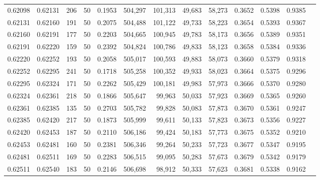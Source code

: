 \begin{tabular}{rrrrrrrrrrrrr}
0.62098 & 0.62131 &   206 &  50 &                                     0.1953 & 504,297 & 101,313 &  49,683 &  58,273 & 0.3652 & 0.5398 & 0.9385 \\
0.62131 & 0.62160 &   191 &  50 &                                     0.2075 & 504,488 & 101,122 &  49,733 &  58,223 & 0.3654 & 0.5393 & 0.9367 \\
0.62160 & 0.62191 &   177 &  50 &                                     0.2203 & 504,665 & 100,945 &  49,783 &  58,173 & 0.3656 & 0.5389 & 0.9351 \\
0.62191 & 0.62220 &   159 &  50 &                                     0.2392 & 504,824 & 100,786 &  49,833 &  58,123 & 0.3658 & 0.5384 & 0.9336 \\
0.62220 & 0.62252 &   193 &  50 &                                     0.2058 & 505,017 & 100,593 &  49,883 &  58,073 & 0.3660 & 0.5379 & 0.9318 \\
0.62252 & 0.62295 &   241 &  50 &                                     0.1718 & 505,258 & 100,352 &  49,933 &  58,023 & 0.3664 & 0.5375 & 0.9296 \\
0.62295 & 0.62324 &   171 &  50 &                                     0.2262 & 505,429 & 100,181 &  49,983 &  57,973 & 0.3666 & 0.5370 & 0.9280 \\
0.62324 & 0.62361 &   218 &  50 &                                     0.1866 & 505,647 &  99,963 &  50,033 &  57,923 & 0.3669 & 0.5365 & 0.9260 \\
0.62361 & 0.62385 &   135 &  50 &                                     0.2703 & 505,782 &  99,828 &  50,083 &  57,873 & 0.3670 & 0.5361 & 0.9247 \\
0.62385 & 0.62420 &   217 &  50 &                                     0.1873 & 505,999 &  99,611 &  50,133 &  57,823 & 0.3673 & 0.5356 & 0.9227 \\
0.62420 & 0.62453 &   187 &  50 &                                     0.2110 & 506,186 &  99,424 &  50,183 &  57,773 & 0.3675 & 0.5352 & 0.9210 \\
0.62453 & 0.62481 &   160 &  50 &                                     0.2381 & 506,346 &  99,264 &  50,233 &  57,723 & 0.3677 & 0.5347 & 0.9195 \\
0.62481 & 0.62511 &   169 &  50 &                                     0.2283 & 506,515 &  99,095 &  50,283 &  57,673 & 0.3679 & 0.5342 & 0.9179 \\
0.62511 & 0.62540 &   183 &  50 &                                     0.2146 & 506,698 &  98,912 &  50,333 &  57,623 & 0.3681 & 0.5338 & 0.9162 \\

\end{tabular}
